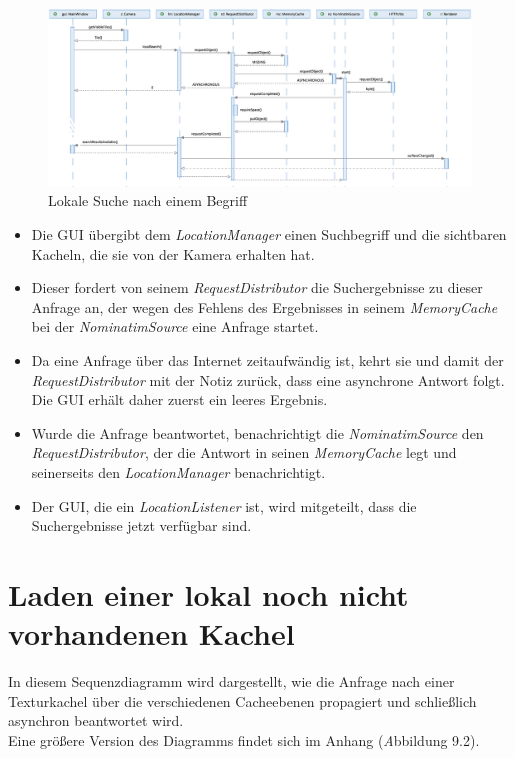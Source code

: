 \documentclass[10pt]{scrreprt}
\newcommand{\textref}[1]{\mbox{\raisebox{0.1ex}{\small$\rightarrow$ }\textit{#1}}}
\begin{document}
\vspace*{5mm}
\begin{figure}[h]
\begin{center}
\includegraphics[scale=0.28]{sequenz-search.eps}
\caption{Lokale Suche nach einem Begriff}
\end{center}
\end{figure}

\begin{itemize}
\item Die GUI übergibt dem \textit{LocationManager} einen Suchbegriff und die sichtbaren Kacheln, die sie von der Kamera erhalten hat.
\item Dieser fordert von seinem \textit{RequestDistributor} die Suchergebnisse zu dieser Anfrage an, der wegen des Fehlens des Ergebnisses in seinem \textit{MemoryCache} bei der \textit{NominatimSource} eine Anfrage startet. 
\item Da eine Anfrage über das Internet zeitaufwändig ist, kehrt sie und damit der \textit{RequestDistributor} mit der Notiz zurück, dass eine asynchrone Antwort folgt. Die GUI erhält daher zuerst ein leeres Ergebnis.
\item Wurde die Anfrage beantwortet, benachrichtigt die \textit{NominatimSource} den \textit{RequestDistributor}, der die Antwort in seinen \textit{MemoryCache} legt und seinerseits den \textit{LocationManager} benachrichtigt.
\item Der GUI, die ein \textit{LocationListener} ist, wird mitgeteilt, dass die Suchergebnisse jetzt verfügbar sind.
\end{itemize}
\newpage


\section{Laden einer lokal noch nicht vorhandenen Kachel}

In diesem Sequenzdiagramm wird dargestellt, wie die Anfrage nach einer Texturkachel über die verschiedenen Cacheebenen propagiert und schließlich asynchron beantwortet wird.\\[3mm]
Eine größere Version des Diagramms findet sich im Anhang (\textref Abbildung 9.2).
\end{document}
